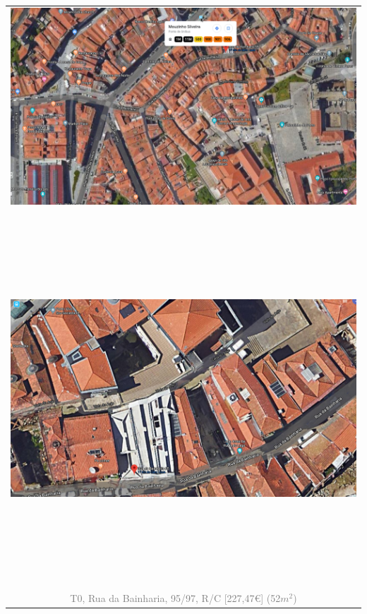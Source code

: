 \documentclass[]{report}
\begin{document}
\begin{table}[]
	\begin{center}
	\begin{huge}
	\begin{tabular}{c}
		\includegraphics[width=1\textwidth]{rua_da_bainharia_95_97_rc_sat} \\
		~\\
		~\\
		~\\
		~\\
		~\\
		\includegraphics[width=1\textwidth]{rua_da_bainharia_95_97_rc_str} \\
		~\\
		~\\
		~\\
		~\\
		~\\
		\textcolor{gray}{T0, Rua da Bainharia, 95/97, R/C [227,47€] (52$m^{2}$)}
	\end{tabular}
	\end{huge}
	\end{center}
\end{table}
\end{document}
